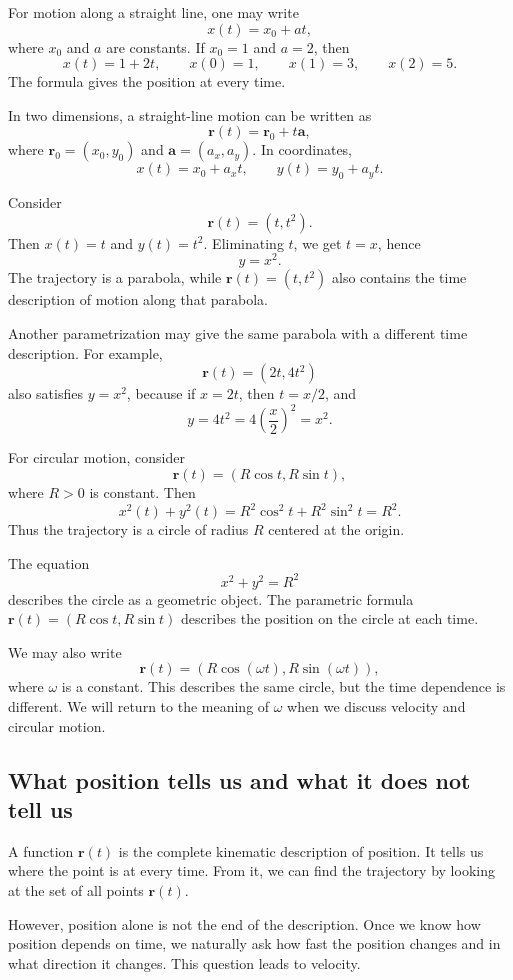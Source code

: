 \begin{examplebox}
For motion along a straight line, one may write
\[
x(t)=x_0+at,
\]
where \(x_0\) and \(a\) are constants. If \(x_0=1\) and \(a=2\), then
\[
x(t)=1+2t,\qquad x(0)=1,\qquad x(1)=3,\qquad x(2)=5.
\]
The formula gives the position at every time.
\end{examplebox}

In two dimensions, a straight-line motion can be written as
\[
\mathbf{r}(t)=\mathbf{r}_0+t\mathbf{a},
\]
where \(\mathbf{r}_0=(x_0,y_0)\) and \(\mathbf{a}=(a_x,a_y)\). In coordinates,
\[
x(t)=x_0+a_xt,\qquad y(t)=y_0+a_yt.
\]

\begin{examplebox}
Consider
\[
\mathbf{r}(t)=(t,t^2).
\]
Then \(x(t)=t\) and \(y(t)=t^2\). Eliminating \(t\), we get \(t=x\), hence
\[
y=x^2.
\]
The trajectory is a parabola, while \(\mathbf{r}(t)=(t,t^2)\) also contains the time description of motion along that parabola.
\end{examplebox}

Another parametrization may give the same parabola with a different time description. For example,
\[
\mathbf{r}(t)=(2t,4t^2)
\]
also satisfies \(y=x^2\), because if \(x=2t\), then \(t=x/2\), and
\[
y=4t^2=4\left(\frac{x}{2}\right)^2=x^2.
\]

\begin{examplebox}
For circular motion, consider
\[
\mathbf{r}(t)=(R\cos t,R\sin t),
\]
where \(R>0\) is constant. Then
\[
x^2(t)+y^2(t)
=R^2\cos^2t+R^2\sin^2t
=R^2.
\]
Thus the trajectory is a circle of radius \(R\) centered at the origin.
\end{examplebox}

The equation
\[
x^2+y^2=R^2
\]
describes the circle as a geometric object. The parametric formula \(\mathbf{r}(t)=(R\cos t,R\sin t)\) describes the position on the circle at each time.

We may also write
\[
\mathbf{r}(t)=(R\cos(\omega t),R\sin(\omega t)),
\]
where \(\omega\) is a constant. This describes the same circle, but the time dependence is different. We will return to the meaning of \(\omega\) when we discuss velocity and circular motion.

\subsection{What position tells us and what it does not tell us}

A function \(\mathbf{r}(t)\) is the complete kinematic description of position. It tells us where the point is at every time. From it, we can find the trajectory by looking at the set of all points \(\mathbf{r}(t)\).

However, position alone is not the end of the description. Once we know how position depends on time, we naturally ask how fast the position changes and in what direction it changes. This question leads to velocity.
